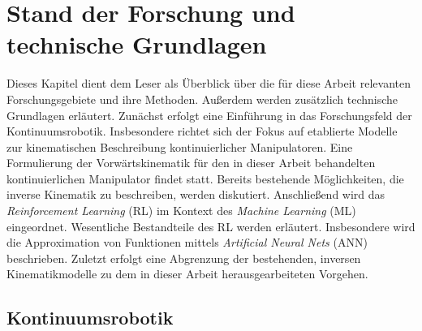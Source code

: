 \chapter{Stand der Forschung und technische Grundlagen}

Dieses Kapitel dient dem Leser als Überblick über die für diese Arbeit relevanten Forschungsgebiete und ihre Methoden. Außerdem werden zusätzlich technische Grundlagen erläutert. Zunächst erfolgt eine Einführung in das Forschungsfeld der Kontinuumsrobotik. Insbesondere richtet sich der Fokus auf etablierte Modelle zur kinematischen Beschreibung kontinuierlicher Manipulatoren. Eine Formulierung der Vorwärtskinematik für den in dieser Arbeit behandelten kontinuierlichen Manipulator findet statt. Bereits bestehende Möglichkeiten, die inverse Kinematik zu beschreiben, werden diskutiert.
Anschließend wird das \textit{Reinforcement Learning} (RL) im Kontext des \textit{Machine Learning} (ML) eingeordnet. Wesentliche Bestandteile des RL werden erläutert. Insbesondere wird die Approximation von Funktionen mittels \textit{Artificial Neural Nets} (ANN) beschrieben. Zuletzt erfolgt eine Abgrenzung der bestehenden, inversen Kinematikmodelle zu dem in dieser Arbeit herausgearbeiteten Vorgehen. 



\section{Kontinuumsrobotik}
\label{sec:kontinuumsrobotik}

